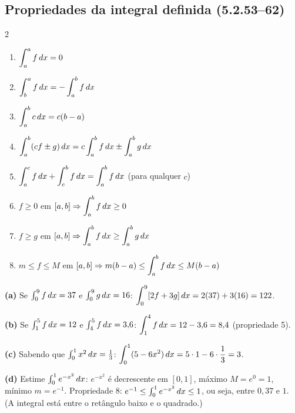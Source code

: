 \subsection{Propriedades da integral definida (5.2.53--62)}

\begin{definicao}[{Propriedades}]
\begin{multicols}{2}
\begin{enumerate}[leftmargin=1.6em, itemsep=1pt]
\item $\displaystyle\int_a^a f\,dx=0$
\item $\displaystyle\int_b^a f\,dx=-\int_a^b f\,dx$
\item $\displaystyle\int_a^b c\,dx=c(b-a)$
\item $\displaystyle\int_a^b(cf\pm g)\,dx=c\int_a^b f\,dx\pm\int_a^b g\,dx$
\item $\displaystyle\int_a^c f\,dx+\int_c^b f\,dx=\int_a^b f\,dx$ (para qualquer $c$)
\item $f\ge0$ em $[a,b]\Rightarrow\displaystyle\int_a^b f\,dx\ge0$
\item $f\ge g$ em $[a,b]\Rightarrow\displaystyle\int_a^b f\,dx\ge\int_a^b g\,dx$
\item $m\le f\le M$ em $[a,b]\Rightarrow m(b-a)\le\displaystyle\int_a^b f\,dx\le M(b-a)$
\end{enumerate}
\end{multicols}
\end{definicao}

\begin{exemplo}
\textbf{(a)} Se $\int_0^9 f\,dx=37$ e $\int_0^9 g\,dx=16$: $\displaystyle\int_0^9[2f+3g]\,dx=2(37)+3(16)=122$.

\textbf{(b)} Se $\int_1^5 f\,dx=12$ e $\int_4^5 f\,dx=3{,}6$: $\displaystyle\int_1^4 f\,dx=12-3{,}6=8{,}4$ (propriedade 5).

\textbf{(c)} Sabendo que $\int_0^1 x^2\,dx=\frac13$: $\displaystyle\int_0^1(5-6x^2)\,dx=5\cdot1-6\cdot\frac13=3$.

\textbf{(d)} Estime $\int_0^1 e^{-x^2}\,dx$: $e^{-x^2}$ é decrescente em $[0,1]$, máximo $M=e^0=1$, mínimo $m=e^{-1}$. Propriedade 8: $e^{-1}\le\int_0^1 e^{-x^2}\,dx\le1$, ou seja, entre $0{,}37$ e $1$. (A integral está entre o retângulo baixo e o quadrado.)
\end{exemplo}


